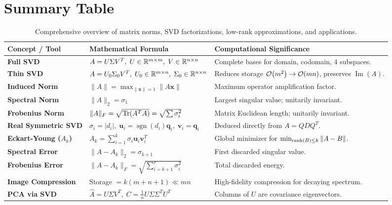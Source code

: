 \section{Summary Table}
\label{sec:summary-table-en}

\begin{table}[H]
\centering
\small
\renewcommand{\arraystretch}{1.3}
\begin{tabularx}{\textwidth}{p{4.2cm} p{4.6cm} X}
\toprule
\textbf{Concept / Tool} & \textbf{Mathematical Formula} & \textbf{Computational Significance} \\
\midrule
\textbf{Full SVD} & $A = U \Sigma V^T, \; U \in \mathbb{R}^{m \times m}, \; V \in \mathbb{R}^{n \times n}$ & Complete bases for domain, codomain, 4 subspaces. \\
\textbf{Thin SVD} & $A = U_0 \Sigma_0 V^T, \; U_0 \in \mathbb{R}^{m \times n}, \; \Sigma_0 \in \mathbb{R}^{n \times n}$ & Reduces storage $\mathcal{O}\!\left(m^2\right) \to \mathcal{O}\!\left(mn\right)$, preserves $\operatorname{Im}(A)$. \\
\textbf{Induced Norm} & $\|A\| = \max_{\|\mathbf{x}\|=1} \|A\mathbf{x}\|$ & Maximum operator amplification factor. \\
\textbf{Spectral Norm} & $\|A\|_2 = \sigma_1$ & Largest singular value; unitarily invariant. \\
\textbf{Frobenius Norm} & $\|A\|_F = \sqrt{\operatorname{Tr}(A^T A)} = \sqrt{\sum \sigma_i^2}$ & Matrix Euclidean length; unitarily invariant. \\
\textbf{Real Symmetric SVD} & $\sigma_i = |d_i|, \; \mathbf{u}_i = \operatorname{sgn}(d_i)\mathbf{q}_i, \; \mathbf{v}_i = \mathbf{q}_i$ & Deduced directly from $A = Q D Q^T$. \\
\textbf{Eckart-Young ($A_k$)} & $A_k = \sum_{i=1}^k \sigma_i \mathbf{u}_i \mathbf{v}_i^T$ & Global minimizer for $\min_{\operatorname{rank}(B)\le k} \|A-B\|$. \\
\textbf{Spectral Error} & $\|A - A_k\|_2 = \sigma_{k+1}$ & First discarded singular value. \\
\textbf{Frobenius Error} & $\|A - A_k\|_F = \sqrt{\sum_{i=k+1}^r \sigma_i^2}$ & Total discarded energy. \\
\textbf{Image Compression} & Storage $= k(m + n + 1) \ll mn$ & High-fidelity compression for decaying spectrum. \\
\textbf{PCA via SVD} & $\widehat{A} = U \Sigma V^T, \; C = \frac{1}{n} U \Sigma \Sigma^T U^T$ & Columns of $U$ are covariance eigenvectors. \\
\bottomrule
\end{tabularx}
\caption{Comprehensive overview of matrix norms, SVD factorizations, low-rank approximations, and applications.}
\label{tab:summary-svd-norms-en}
\end{table}
